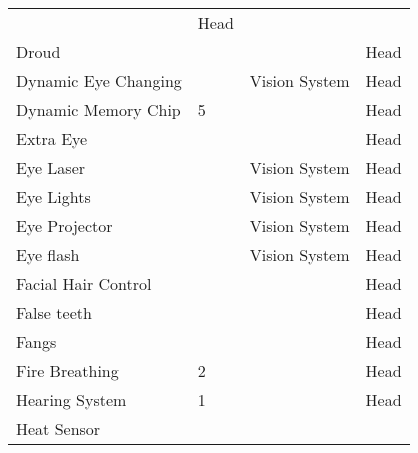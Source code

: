 \documentclass[twoside]{book}
\begin{document}
\begin{longtable}{p{1.25in}p{2em}ll}
  &
   Head 
  \tabularnewline
      
  \raggedright
           Droud 
  &
  
  &
  
  &
   Head 
  \tabularnewline
      
  \raggedright
           Dynamic Eye Changing 
  &
  
  &
   Vision System 
  &
   Head 
  \tabularnewline
      
  \raggedright
           Dynamic Memory Chip 
  &
   5 
  &
  
  &
   Head 
  \tabularnewline
      
  \raggedright
           Extra Eye 
  &
  
  &
  
  &
   Head 
  \tabularnewline
      
  \raggedright
           Eye Laser 
  &
  
  &
   Vision System 
  &
   Head 
  \tabularnewline
      
  \raggedright
           Eye Lights 
  &
  
  &
   Vision System 
  &
   Head 
  \tabularnewline
      
  \raggedright
           Eye Projector 
  &
  
  &
   Vision System 
  &
   Head 
  \tabularnewline
      
  \raggedright
           Eye flash 
  &
  
  &
   Vision System 
  &
   Head 
  \tabularnewline
      
  \raggedright
           Facial Hair Control 
  &
  
  &
  
  &
   Head 
  \tabularnewline
      
  \raggedright
           False teeth 
  &
  
  &
  
  &
   Head 
  \tabularnewline
      
  \raggedright
           Fangs 
  &
  
  &
  
  &
   Head 
  \tabularnewline
      
  \raggedright
           Fire Breathing 
  &
   2 
  &
  
  &
   Head 
  \tabularnewline
      
  \raggedright
           Hearing System 
  &
   1 
  &
  
  &
   Head 
  \tabularnewline
      
  \raggedright
           Heat Sensor 
  &
  

\end{longtable}
\end{document}
